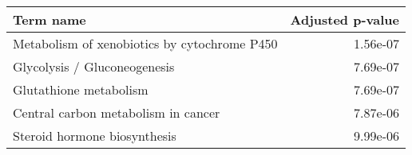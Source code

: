 \begin{tabular}{lr}
\toprule
                                   Term name &  Adjusted p-value \\
\midrule
Metabolism of xenobiotics by cytochrome P450 &          1.56e-07 \\
                Glycolysis / Gluconeogenesis &          7.69e-07 \\
                      Glutathione metabolism &          7.69e-07 \\
         Central carbon metabolism in cancer &          7.87e-06 \\
                Steroid hormone biosynthesis &          9.99e-06 \\
\bottomrule
\end{tabular}
